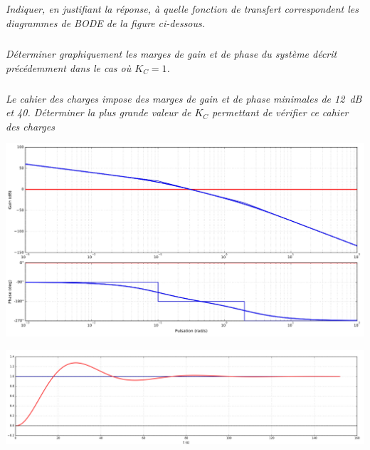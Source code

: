 \documentclass[10pt,fleqn]{article} %
\begin{document}
\begin{multicols}{2}
\else
\fi



\subparagraph{}\textit{Indiquer, en justifiant la réponse, à quelle fonction de transfert correspondent les diagrammes de
BODE de la figure ci-dessous.}

\subparagraph*{}\textit{Déterminer graphiquement les marges de gain et de phase du système décrit précédemment dans le
cas où $K_C=1$.}

\subparagraph*{}\textit{Le cahier des charges impose des marges de gain et de phase minimales de \SI{12}{dB} et 40\degres. Déterminer
la plus grande valeur de $K_C$ permettant de vérifier ce cahier des charges}


\ifprof
\else
\end{multicols}
\fi



\ifprof
\else

\begin{center}
\includegraphics[width=\linewidth]{images/fig_03}
\end{center}

\fi


\ifprof
\begin{center}
\includegraphics[width=\linewidth]{images/cor_02}
\end{center}

\else
\fi


\end{document}
